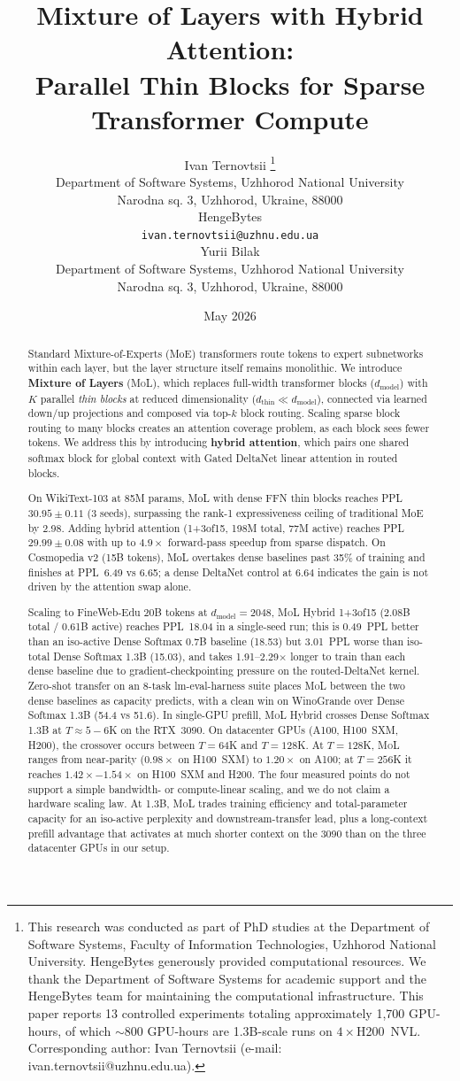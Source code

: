 \documentclass[10pt]{article}
\title{Mixture of Layers with Hybrid Attention:\\
Parallel Thin Blocks for Sparse Transformer Compute}
\author{
  Ivan Ternovtsii \orcidicon{0009-0009-9267-8516}\thanks{This research was conducted as part of PhD studies at the Department of Software Systems, Faculty of Information Technologies, Uzhhorod National University. HengeBytes generously provided computational resources. We thank the Department of Software Systems for academic support and the HengeBytes team for maintaining the computational infrastructure. This paper reports 13 controlled experiments totaling approximately 1{,}700 GPU-hours, of which $\sim$800 GPU-hours are 1.3B-scale runs on $4{\times}$H200~NVL. Corresponding author: Ivan Ternovtsii (e-mail: ivan.ternovtsii@uzhnu.edu.ua).} \\
  Department of Software Systems, Uzhhorod National University\\
  Narodna sq. 3, Uzhhorod, Ukraine, 88000\\
  HengeBytes\\
  \texttt{ivan.ternovtsii@uzhnu.edu.ua} \\
  \And
  Yurii Bilak \orcidicon{0000-0001-5989-1643} \\
  Department of Software Systems, Uzhhorod National University\\
  Narodna sq. 3, Uzhhorod, Ukraine, 88000\\
}
\date{May 2026}
\newcommand{\mol}{\textsc{MoL}}
\newcommand{\dmodel}{d_\text{model}}
\newcommand{\dthin}{d_\text{thin}}
\begin{document}
\maketitle

\begin{abstract}
Standard Mixture-of-Experts (MoE) transformers route tokens to expert subnetworks within each layer, but the layer structure itself remains monolithic.
We introduce \textbf{Mixture of Layers} (\mol{}), which replaces full-width transformer blocks ($\dmodel$) with $K$ parallel \emph{thin blocks} at reduced dimensionality ($\dthin \ll \dmodel$), connected via learned down/up projections and composed via top-$k$ block routing.
Scaling sparse block routing to many blocks creates an attention coverage problem, as each block sees fewer tokens.
We address this by introducing \textbf{hybrid attention}, which pairs one shared softmax block for global context with Gated DeltaNet \citep{yang2024gated} linear attention in routed blocks.

On WikiText-103 at 85M params, MoL with dense FFN thin blocks reaches PPL~$30.95 \pm 0.11$ (3 seeds), surpassing the rank-1 expressiveness ceiling of traditional MoE by 2.98. Adding hybrid attention (1+3of15, 198M total, 77M active) reaches PPL~$29.99 \pm 0.08$ with up to $4.9\times$ forward-pass speedup from sparse dispatch. On Cosmopedia v2 (15B tokens), MoL overtakes dense baselines past 35\% of training and finishes at PPL~6.49 vs 6.65; a dense DeltaNet control at 6.64 indicates the gain is not driven by the attention swap alone.

Scaling to FineWeb-Edu 20B tokens at $d_\textrm{model}{=}2048$, \mol{} Hybrid 1+3of15 (2.08B total / 0.61B active) reaches PPL~18.04 in a single-seed run; this is 0.49~PPL better than an iso-active Dense Softmax 0.7B baseline (18.53) but 3.01~PPL worse than iso-total Dense Softmax 1.3B (15.03), and takes 1.91--2.29$\times$ longer to train than each dense baseline due to gradient-checkpointing pressure on the routed-DeltaNet kernel. Zero-shot transfer on an 8-task lm-eval-harness suite places \mol{} between the two dense baselines as capacity predicts, with a clean win on WinoGrande over Dense Softmax 1.3B (54.4 vs 51.6).
In single-GPU prefill, \mol{} Hybrid crosses Dense Softmax 1.3B at $T{\approx}5{-}6$K on the RTX~3090. On datacenter GPUs (A100, H100~SXM, H200), the crossover occurs between $T{=}64$K and $T{=}128$K. At $T{=}128$K, \mol{} ranges from near-parity ($0.98\times$ on H100~SXM) to $1.20\times$ on A100; at $T{=}256$K it reaches $1.42\times{-}1.54\times$ on H100~SXM and H200. The four measured points do not support a simple bandwidth- or compute-linear scaling, and we do not claim a hardware scaling law.
At 1.3B, \mol{} trades training efficiency and total-parameter capacity for an iso-active perplexity and downstream-transfer lead, plus a long-context prefill advantage that activates at much shorter context on the 3090 than on the three datacenter GPUs in our setup.

\end{abstract}
\end{document}
